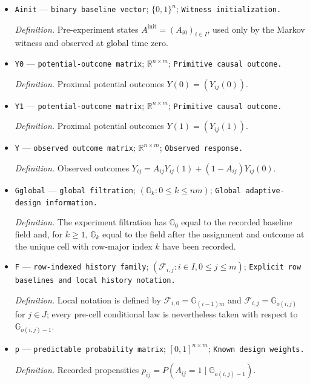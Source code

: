 \documentclass{article}
\begin{document}
\begin{itemize}
  \par\smallskip\noindent\emph{Definition.} Treatment assignments \(A=(A_{ij})\).
  \item \texttt{Ainit} --- \texttt{binary baseline vector}; \(\{0,1\}^n\); \texttt{Witness initialization.}
  \par\smallskip\noindent\emph{Definition.} Pre-experiment states \(A^{\mathrm{init}}=(A_{i0})_{i\in I}\), used only by the Markov witness and observed at global time zero.
  \item \texttt{Y0} --- \texttt{potential-\allowbreak{}outcome matrix}; \(\mathbb R^{n\times m}\); \texttt{Primitive causal outcome.}
  \par\smallskip\noindent\emph{Definition.} Proximal potential outcomes \(Y(0)=(Y_{ij}(0))\).
  \item \texttt{Y1} --- \texttt{potential-\allowbreak{}outcome matrix}; \(\mathbb R^{n\times m}\); \texttt{Primitive causal outcome.}
  \par\smallskip\noindent\emph{Definition.} Proximal potential outcomes \(Y(1)=(Y_{ij}(1))\).
  \item \texttt{Y} --- \texttt{observed outcome matrix}; \(\mathbb R^{n\times m}\); \texttt{Observed response.}
  \par\smallskip\noindent\emph{Definition.} Observed outcomes \(Y_{ij}=A_{ij}Y_{ij}(1)+(1-A_{ij})Y_{ij}(0)\).
  \item \texttt{Gglobal} --- \texttt{global filtration}; \((\mathbb G_k:0\le k\le nm)\); \texttt{Global adaptive-\allowbreak{}design information.}
  \par\smallskip\noindent\emph{Definition.} The experiment filtration has \(\mathbb G_0\) equal to the recorded baseline field and, for \(k\ge1\), \(\mathbb G_k\) equal to the field after the assignment and outcome at the unique cell with row-major index \(k\) have been recorded.
  \item \texttt{F} --- \texttt{row-\allowbreak{}indexed history family}; \((\mathcal F_{i,j}:i\in I,0\le j\le m)\); \texttt{Explicit row baselines and local history notation.}
  \par\smallskip\noindent\emph{Definition.} Local notation is defined by \(\mathcal F_{i,0}=\mathbb G_{(i-1)m}\) and \(\mathcal F_{i,j}=\mathbb G_{o(i,j)}\) for \(j\in J\); every pre-cell conditional law is nevertheless taken with respect to \(\mathbb G_{o(i,j)-1}\).
  \item \texttt{p} --- \texttt{predictable probability matrix}; \([0,1]^{n\times m}\); \texttt{Known design weights.}
  \par\smallskip\noindent\emph{Definition.} Recorded propensities \(p_{ij}=P(A_{ij}=1\mid\mathbb G_{o(i,j)-1})\).

\end{itemize}
\end{document}
